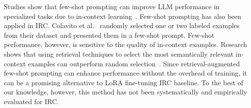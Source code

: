  Studies show that few-shot prompting can improve LLM performance in specialized tasks due to in-context learning~\cite{assi2026llm, le2023log, ma2023fairnessguidedfewshotpromptinglarge, logan2021cuttingpromptsparameterssimple, brown2020language}. Few-shot prompting has also been applied in IRC. Colavito et al.~\cite{colavito2025benchmarking, colavito2024leveraging} randomly selected one or two labeled examples from their dataset and presented them in a few-shot prompt. Few-shot performance, however, is sensitive to the quality of in-context examples. Research shows that using retrieval techniques to select the most semantically relevant in-context examples can outperform random selection~\cite{liu2022makes, yu2023retrieval}. Since retrieval-augmented few-shot prompting can enhance performance without the overhead of training, it can be a promising alternative to LoRA fine-tuning IRC baseline. To the best of our knowledge, however, this method has not been systematically and empirically evaluated for IRC.
